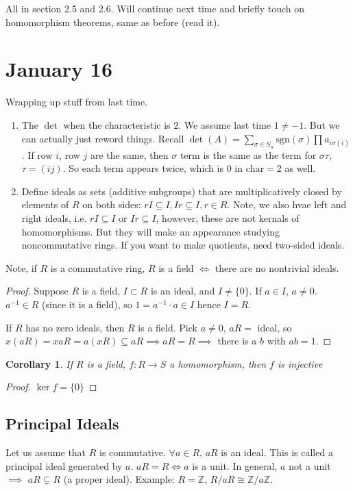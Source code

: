 \documentclass{article}
\theoremstyle{plain}
\newtheorem{corollary}{Corollary}
\theoremstyle{remark}
\newcommand{\Z}{{\mathbb Z}}
\begin{document}
All in section 2.5 and 2.6.
Will continue next time and briefly touch on homomorphism theorems,
same as before (read it).

\section{January 16}
Wrapping up stuff from last time.
\begin{enumerate}
	\item The $\det$ when the characteristic is $2$.
		We assume last time $1 \neq -1$.
		But we can actually just reword things.
		Recall $\det(A) = \sum_{\sigma \in S_n}\mathrm{sgn}(\sigma)\prod a_{i\sigma(i)}$.
		If row $i$, row $j$ are the same, then $\sigma$ term
		is the same as the term for $\sigma \tau$, $\tau = (ij)$.
		So each term appears twice, which is $0$ in $\mathrm{char} = 2$ as well.
	\item Define ideals as sets (additive subgroups) that are
		multiplicatively closed by elements of $R$ on both sides:
		$rI \subseteq I, Ir \subseteq I, r \in R$.
		Note, we also hvae left and right ideals, i.e. $rI \subseteq I$
		or $Ir \subseteq I$, however,
		these are not kernals of homomorphisms.
		But they will make an appearance studying noncommutative rings.
		If you want to make quotients, need two-sided ideals.
\end{enumerate}
Note, if $R$ is a commutative ring,
$R$ is a field $\iff$ there are no nontrivial ideals.
\begin{proof}
	Suppose $R$ is a field, $I \subset R$ is an ideal, and $I \neq \{0\}$.
	If $a \in I$, $a \neq 0$.
	$a^{-1} \in R$ (since it is a field), so $1 = a^{-1}\cdot a \in I$
	hence $I = R$.

	If $R$ has no zero ideals, then $R$ is a field.
	Pick $a \neq 0$, $aR = $ ideal,
	so $x(aR) = xaR = a(xR) \subseteq aR \implies aR = R \implies$
	there is a $b$ with $ab = 1$.
\end{proof}
\begin{corollary}
	If $R$ is a field, $f \colon R \to S$ a homomorphism,
	then $f$ is injective
\end{corollary}
\begin{proof}
	$\ker f = \{0\}$
\end{proof}

\subsection{Principal Ideals}
Let us assume that $R$ is commutative.
$\forall a \in R$, $aR$ is an ideal.
This is called a principal ideal generated by $a$.
$aR = R \iff a$ is a unit.
In general, $a$ not a unit $\implies$ $aR \subsetneq R$ (a proper ideal).
Example: $R = \Z$, $R/aR \cong \Z/a\Z$.
\end{document}
